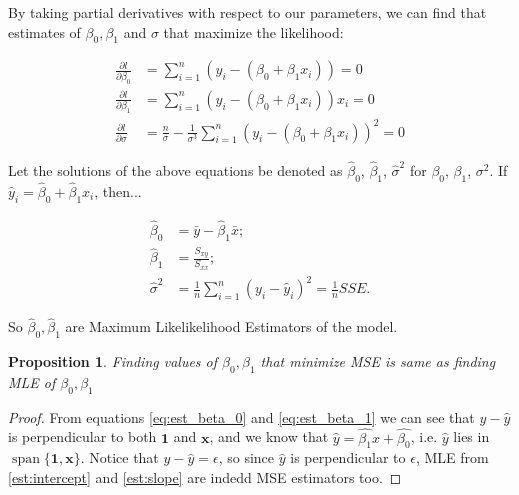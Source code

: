 \documentclass[12pt,a4paper,oneside]{book} %
\DeclareMathOperator{\spn}{span}
\newtheorem{proposition}[theorem]{Proposition}
\begin{document}
By taking partial derivatives with respect to our parameters, we can find that estimates of $\beta_0, \beta_1$ and $\sigma$ that maximize the likelihood:

\begin{align}
	\frac{\partial l}{\partial \beta_0} &= \sum_{i=1}^{n} (y_i - (\beta_0 + \beta_1 x_i)) = 0 \label{eq:est_beta_0} \\
	\frac{\partial l}{\partial \beta_1} &= \sum_{i=1}^{n} (y_i - (\beta_0 + \beta_1 x_i))x_i = 0 \label{eq:est_beta_1} \\
	\frac{\partial l}{\partial \sigma} &= \frac{n}{\sigma} - \frac{1}{\sigma^3} \sum_{i=1}^{n} (y_i - (\beta_0 + \beta_1 x_i))^2 = 0 
\end{align}
	

Let the solutions of the above equations be denoted as $\hat{\beta}_0$, $\hat{\beta}_1$, $\hat{\sigma}^2$ for $\beta_0$, $\beta_1$, $\sigma^2$. If $\hat{y}_i = \hat{\beta}_0 + \hat{\beta}_1 x_i$, then...

\begin{align}
\hat{\beta}_0  &= \bar{y} - \hat{\beta}_1 \bar{x}; \label{est:intercept} \\
\hat{\beta}_1 &= \frac{S_{xy}}{S_{xx}}; \label{est:slope}\\
\hat{\sigma}^2 &= \frac{1}{n} \sum_{i=1}^{n} (y_i - \hat{y}_i)^2 = \frac{1}{n} SSE.
\end{align}

So $\hat{\beta}_0, \hat{\beta}_1$ are Maximum Likelikelihood Estimators of the model.

\begin{proposition}
	Finding values of $\beta_0, \beta_1 $ that minimize MSE is same as finding MLE of $\beta_0 ,\beta_1 $
\end{proposition}


\begin{proof}
	From equations \ref{eq:est_beta_0} and \ref{eq:est_beta_1} we can see that $y-\hat{y}$ is perpendicular to both $\mathbf{1}$ and $\mathbf{x}$, and we know that $\hat{y}=\hat{\beta_1}x+\hat{\beta_0}$, i.e. $\hat{y}$ lies in $\spn \{ \mathbf{1}, \mathbf{x} \}$.
	Notice that $y-\hat{y}=\epsilon$, so since $\hat{y}$ is perpendicular to $\epsilon$, MLE from \ref{est:intercept} and \ref{est:slope} are indedd MSE estimators too.
\end{proof}
\end{document}
